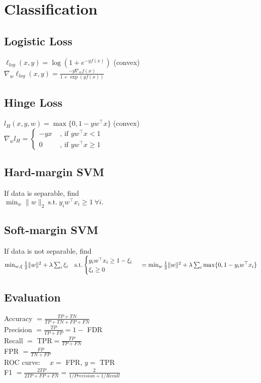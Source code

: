 \section*{Classification}
\subsection*{Logistic Loss}
$\ell_{log}(x,y) = \log(1+e^{-yf(x)})$ (convex)\\
$\nabla_w \ell_{log}(x,y) = \frac{-y\nabla_w f(x)}{1+\exp(yf(x))} $

\subsection*{Hinge Loss}
$l_H(x,y,w) = \max \{0,1-y w^\top x\}$ (convex)\\
$\nabla_w l_H = \begin{cases}
    -y x&\text{ , if $yw^\top x<1$}\\
	0 &\text{ , if $y w^\top x \geq 1$}
\end{cases}$

\subsection*{Hard-margin SVM}
If data is separable, find \\
$\min_w \lVert w \rVert_2 \ \text{s.t.} \ y_iw^\top x_i\geq 1 \ \forall i.$\\

\subsection*{Soft-margin SVM}
If data is not separable, find \\
$\min_{w,\xi}\frac{1}{2}\|w\|^2  +\lambda\sum_i\xi_i\ \ \ 
\text{s.t.} \begin{cases}
    y_iw^\top x_i\geq 1-\xi_i\\
    \xi_i\geq0
\end{cases}\\
=\min_w\frac{1}{2}\|w\|^2+\lambda\sum_i\max \{0,1-y_i w^\top x_i\}$


\subsection*{Evaluation}
Accuracy $=\frac{TP+TN}{TP+TN+FP+FN}$\\
Precision $=\frac{TP}{TP+FP}= 1-$ FDR\\
Recall $=$ TPR$ =\frac{TP}{TP+FN}$\\
FPR $=\frac{FP}{TN+FP}$\\
ROC curve: \ \ $x=$ FPR, $y=$ TPR\\
F1 $=\frac{2TP}{2TP+FP+FN}=\frac{2}{1/Precision+1/Recall}$\\